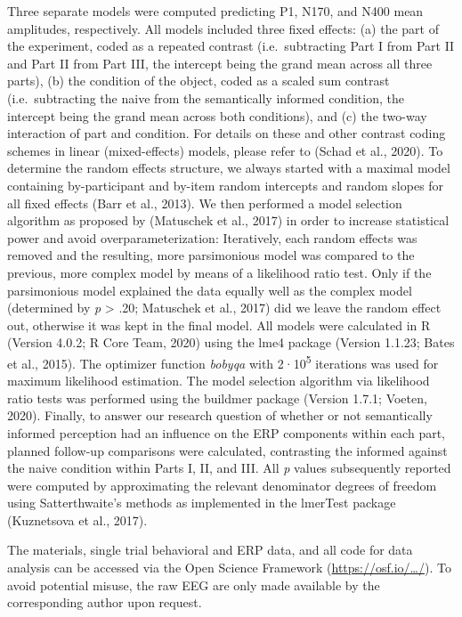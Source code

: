 \documentclass[
  english,
  man,11pt,floatsintext]{apa7}
\begin{document}
Three separate models were computed predicting P1, N170, and N400 mean amplitudes, respectively. All models included three fixed effects: (a) the part of the experiment, coded as a repeated contrast (i.e.~subtracting Part I from Part II and Part II from Part III, the intercept being the grand mean across all three parts), (b) the condition of the object, coded as a scaled sum contrast (i.e.~subtracting the naive from the semantically informed condition, the intercept being the grand mean across both conditions), and (c) the two-way interaction of part and condition. For details on these and other contrast coding schemes in linear (mixed-effects) models, please refer to (Schad et al., 2020). To determine the random effects structure, we always started with a maximal model containing by-participant and by-item random intercepts and random slopes for all fixed effects (Barr et al., 2013). We then performed a model selection algorithm as proposed by (Matuschek et al., 2017) in order to increase statistical power and avoid overparameterization: Iteratively, each random effects was removed and the resulting, more parsimonious model was compared to the previous, more complex model by means of a likelihood ratio test. Only if the parsimonious model explained the data equally well as the complex model (determined by \emph{p} \textgreater{} .20; Matuschek et al., 2017) did we leave the random effect out, otherwise it was kept in the final model. All models were calculated in R (Version 4.0.2; R Core Team, 2020) using the lme4 package (Version 1.1.23; Bates et al., 2015). The optimizer function \emph{bobyqa} with 2·10\textsuperscript{5} iterations was used for maximum likelihood estimation. The model selection algorithm via likelihood ratio tests was performed using the buildmer package (Version 1.7.1; Voeten, 2020). Finally, to answer our research question of whether or not semantically informed perception had an influence on the ERP components within each part, planned follow-up comparisons were calculated, contrasting the informed against the naive condition within Parts I, II, and III. All \emph{p} values subsequently reported were computed by approximating the relevant denominator degrees of freedom using Satterthwaite's methods as implemented in the lmerTest package (Kuznetsova et al., 2017).

The materials, single trial behavioral and ERP data, and all code for data analysis can be accessed via the Open Science Framework (\href{https://osf.io/myprojects/}{https://osf.io/\ldots/}). To avoid potential misuse, the raw EEG are only made available by the corresponding author upon request.
\end{document}
